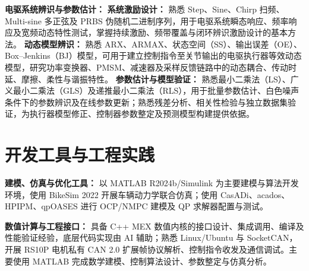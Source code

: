 \documentclass[10pt,a4paper]{article}
\newcommand{\cvsection}[2]{%
  \section{\texorpdfstring{\makebox[\widthof{#1}][c]{\color{CVBlue}#1}\hspace{0.35em}#2}{#2}}%
}
\newcommand{\resumepara}[2]{%
  \noindent\textbf{#1：}#2\par\vspace{0.16em}%
}
\begin{document}
\resumepara{电驱系统辨识与参数估计}{
\textbf{系统激励设计：} 熟悉 Step、Sine、Chirp 扫频、Multi-sine 多正弦及 PRBS 伪随机二进制序列，用于电驱系统瞬态响应、频率响应及宽频动态特性测试，掌握持续激励、频带覆盖与闭环辨识激励设计的基本方法。
\textbf{动态模型辨识：} 熟悉 ARX、ARMAX、状态空间（SS）、输出误差（OE）、Box--Jenkins（BJ）模型，可用于建立控制指令至关节输出的电驱执行器等效动态模型，研究功率变换器、PMSM、减速器及采样反馈链路中的动态耦合、传动时延、摩擦、柔性与谐振特性。
\textbf{参数估计与模型验证：} 熟悉最小二乘法（LS）、广义最小二乘法（GLS）及递推最小二乘法（RLS），用于批量参数估计、白色噪声条件下的参数辨识及在线参数更新；熟悉残差分析、相关性检验与独立数据集验证，为执行器模型修正、控制器参数整定及预测模型构建提供依据。
}


\cvsection{\faWrench}{开发工具与工程实践}

\resumepara{建模、仿真与优化工具}{
以 MATLAB R2024b/Simulink 为主要建模与算法开发环境，使用 BikeSim 2022 开展车辆动力学联合仿真；使用 CasADi、acados、HPIPM、qpOASES 进行 OCP/NMPC 建模及 QP 求解器配置与测试。
}

\resumepara{数值计算与工程接口}{
具备 C++ MEX 数值内核的接口设计、集成调用、编译及性能验证经验，底层代码实现由 AI 辅助；熟悉 Linux/Ubuntu 与 SocketCAN，开展 RS10P 电机私有 CAN 2.0 扩展帧协议解析、控制指令收发及通信调试。主要使用 MATLAB 完成数学建模、控制算法设计、参数整定与仿真分析。
}
\end{document}
